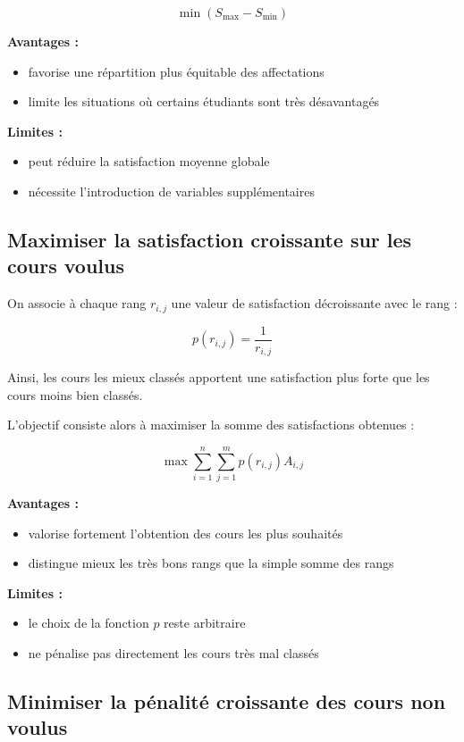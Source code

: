 \documentclass[11pt]{article}
\begin{document}
\[
\min (S_{\max} - S_{\min})
\]

\textbf{Avantages :}

\begin{itemize}
\item favorise une répartition plus équitable des affectations
\item limite les situations où certains étudiants sont très désavantagés
\end{itemize}

\textbf{Limites :}

\begin{itemize}
\item peut réduire la satisfaction moyenne globale
\item nécessite l'introduction de variables supplémentaires
\end{itemize}

\subsection{Maximiser la satisfaction croissante sur les cours voulus}

On associe à chaque rang $r_{i,j}$ une valeur de satisfaction décroissante
avec le rang :

\[
p(r_{i,j}) = \frac{1}{r_{i,j}}
\]

Ainsi, les cours les mieux classés apportent une satisfaction plus forte
que les cours moins bien classés.

L'objectif consiste alors à maximiser la somme des satisfactions obtenues :

\[
\max \sum_{i=1}^{n} \sum_{j=1}^{m} p(r_{i,j}) A_{i,j}
\]

\textbf{Avantages :}

\begin{itemize}
\item valorise fortement l'obtention des cours les plus souhaités
\item distingue mieux les très bons rangs que la simple somme des rangs
\end{itemize}

\textbf{Limites :}

\begin{itemize}
\item le choix de la fonction $p$ reste arbitraire
\item ne pénalise pas directement les cours très mal classés
\end{itemize}

\subsection{Minimiser la pénalité croissante des cours non voulus}
\end{document}
